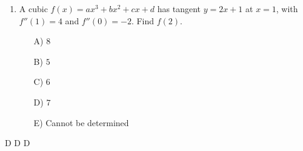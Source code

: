 \documentclass[11pt,a4paper]{article}
\newlength{\ipadheight}
\newcommand{\SpeedSection}[1]{%
  \def\ipadcurrent{#1}%
  \setlength{\ipadheight}{3cm}%
  \ifx\ipadcurrent\ipadB \setlength{\ipadheight}{4.5cm}\fi
  \ifx\ipadcurrent\ipadC \setlength{\ipadheight}{6cm}\fi
  \ifx\ipadcurrent\ipadD \setlength{\ipadheight}{7cm}\fi
  \needspace{5\baselineskip}}
\renewcommand{\ans}[1]{%
  \par\noindent
  \begin{minipage}[t][\ipadheight][t]{\linewidth}%
    \raggedleft\vspace*{\fill}%
    {\fontsize{4}{5}\selectfont\color{black!22}\rotatebox{180}{Ans:~#1}}%
  \end{minipage}%
  \par\vspace{4pt}}
\renewcommand{\method}[1]{}
\renewcommand{\inv}[1]{}
\begin{document}
\begin{enumerate}
\ans{D) $8$}
\method{At $x=3$, $y=\frac43$ and $y'=-\frac{4}{x^2}=-\frac49$. The tangent is $y-\frac43=-\frac49(x-3)$, i.e.\ $y=-\frac49x+\frac83$. It meets the axes at $(6,0)$ and $(0,\frac83)$, so the area is $\frac12\cdot6\cdot\frac83=8$. Decoys: A forgets the $\frac12$; B uses $+\frac49$, which sends the tangent through $O$ and gives area $0$; C gives $xy=3\cdot\frac43=4$ at the contact point; E differentiates $\frac4x$ as $-\frac{1}{x^2}$, giving intercepts $15$ and $\frac53$ and area $\frac{25}{2}$.}
\inv{Show that the area is $8$ wherever the point of contact is, and that the contact point is always the midpoint of $PQ$. What is the area for $y=\dfrac{k}{x}$?}

\needspace{11cm}
\item A cubic $f(x)=ax^3+bx^2+cx+d$ has tangent $y=2x+1$ at $x=1$, with $f''(1)=4$ and $f''(0)=-2$. Find $f(2)$.
\begin{itemize}
\item[A)] $8$
\item[B)] $5$
\item[C)] $6$
\item[D)] $7$
\item[E)] Cannot be determined
\end{itemize}

\ans{A) $8$}
\method{$f''=6ax+2b$. From $f''(0)=-2$, $b=-1$. From $f''(1)=4$, $6a-2=4$, so $a=1$. The tangent at $x=1$ gives both $f'(1)=2$ and $f(1)=3$. Now $f'=3x^2-2x+c$, so $3-2+c=2$ and $c=1$; and $f(1)=1-1+1+d=3$, so $d=2$. Thus $f=x^3-x^2+x+2$ and $f(2)=8-4+2+2=8$. Decoys: B reads $f(2)$ off the tangent ($5$); C ignores $f(1)=3$ and takes $d=0$ ($6$); D writes $f''=6ax+b$, giving $b=-2$, $a=1$, $c=3$, $d=1$ and $f(2)=7$; E treats the tangent as one condition instead of two, leaving $d$ undetermined.}
\inv{The tangent predicts $5$ but the true value is $8$. Show that $f(1+h)-(3+2h)=h^2(2+h)$, and note that the coefficient of $h^2$ is $\frac{f''(1)}{2}$. Is that true for every cubic?}

\end{enumerate}

\SpeedSection{D}
\needspace{14cm}
\end{document}
